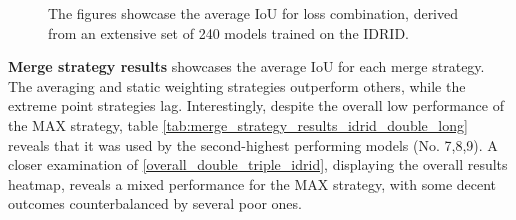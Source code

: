 \begin{figure}[H]%
  \centering
  \caption[Average IoU for Loss Combination (IDRID)]{The figures showcase the average \ac{IoU} for loss combination, derived from an extensive set of 240 models trained on the \acf{IDRID}.}
  \label{discrete_loss_combination_results_idrid_short}
\end{figure}
\textbf{Merge strategy results}\newline
{} showcases the average \ac{IoU} for each merge strategy. The averaging and static weighting strategies outperform others, while the extreme point strategies lag. Interestingly, despite the overall low performance of the MAX strategy, table \ref{tab:merge_strategy_results_idrid_double_long} reveals that it was used by the second-highest performing models (No. 7,8,9). A closer examination of \ref{overall_double_triple_idrid}, displaying the overall results heatmap, reveals a mixed performance for the MAX strategy, with some decent outcomes counterbalanced by several poor ones.
